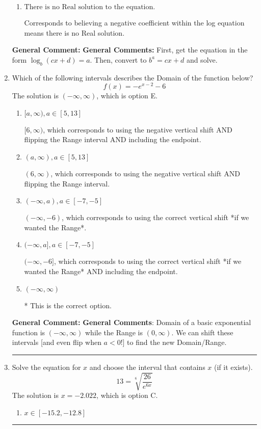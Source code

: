 \documentclass{extbook}[14pt]
\newcommand{\litem}[1]{\item #1

\rule{\textwidth}{0.4pt}}
\begin{document}
\begin{enumerate}
{\begin{enumerate}[label=\Alph*.]
$x = -11.000$, which corresponds to reversing the base and exponent when converting and reversing the value with $x$.
\item \( \text{There is no Real solution to the equation.} \)

Corresponds to believing a negative coefficient within the log equation means there is no Real solution.
\end{enumerate}

\textbf{General Comment:} \textbf{General Comments:} First, get the equation in the form $\log_b{(cx+d)} = a$. Then, convert to $b^a = cx+d$ and solve.
}
\litem{
Which of the following intervals describes the Domain of the function below?
\[ f(x) = -e^{x-2}-6 \]The solution is \( (-\infty, \infty) \), which is option E.\begin{enumerate}[label=\Alph*.]
\item \( [a, \infty), a \in [5, 13] \)

$[6, \infty)$, which corresponds to using the negative vertical shift AND flipping the Range interval AND including the endpoint.
\item \( (a, \infty), a \in [5, 13] \)

$(6, \infty)$, which corresponds to using the negative vertical shift AND flipping the Range interval.
\item \( (-\infty, a), a \in [-7, -5] \)

$(-\infty, -6)$, which corresponds to using the correct vertical shift *if we wanted the Range*.
\item \( (-\infty, a], a \in [-7, -5] \)

$(-\infty, -6]$, which corresponds to using the correct vertical shift *if we wanted the Range* AND including the endpoint.
\item \( (-\infty, \infty) \)

* This is the correct option.
\end{enumerate}

\textbf{General Comment:} \textbf{General Comments}: Domain of a basic exponential function is $(-\infty, \infty)$ while the Range is $(0, \infty)$. We can shift these intervals [and even flip when $a<0$!] to find the new Domain/Range.
}
\litem{
 Solve the equation for $x$ and choose the interval that contains $x$ (if it exists).
\[  13 = \sqrt[6]{\frac{26}{e^{6x}}} \]The solution is \( x = -2.022 \), which is option C.\begin{enumerate}[label=\Alph*.]
\item \( x \in [-15.2, -12.8] \)


\end{enumerate}}
\end{enumerate}
\end{document}
